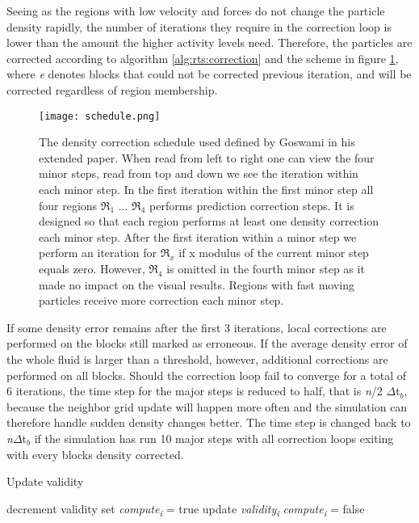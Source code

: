 \documentclass[../../main.tex]{subfiles}
\begin{document}
Seeing as the regions with low velocity and forces do not change the particle density rapidly, the number of iterations they require in the correction loop is lower than the amount the higher activity levels need. Therefore, the particles are corrected according to algorithm \ref{alg:rts:correction} and the scheme in figure \ref{fig:schedule}, where \textit{e} denotes blocks that could not be corrected previous iteration, and will be corrected regardless of region membership. 

\begin{figure}[h!]
    \centering
    \texttt{[image: schedule.png]}
    \caption[Correction scheme for RTS]{ The density correction schedule used defined by Goswami in his extended paper. When read from left to right one can view the four minor steps, read from top and down we see the iteration within each minor step. In the first iteration within the first minor step all four regions $\Re_1$ ... $\Re_4$ performs prediction correction steps. It is designed so that each region performs at least one density correction each minor step. After the first iteration within a minor step we perform an iteration for $\Re_x$ if x modulus of the current minor step equals zero. However, $\Re_4$ is omitted in the fourth minor step as it made no impact on the visual results. Regions with fast moving particles receive more correction each minor step. }
    \label{fig:schedule}
\end{figure}

If some density error remains after the first 3 iterations, local corrections are performed on the blocks still marked as erroneous. If the average density error of the whole fluid is larger than a threshold, however, additional corrections are performed on all blocks. Should the correction loop fail to converge for a total of 6 iterations, the time step for the major steps is reduced to half, that is \textit{n}/2 $\Delta$t$_b$, because the neighbor grid update will happen more often and the simulation can therefore handle sudden density changes better. The time step is changed back to \textit{n}$\Delta$t$_b$ if the simulation has run 10 major steps with all correction loops exiting with every blocks density corrected. 

 
\begin{algorithm}[h]
    \caption{Update validity}
    \label{alg:validity}
    \begin{algorithmic}[1]
            \State decrement validity
                \State set \textit{{\texorpdfstring{compute\textsubscript{i}}{compute i}}} = true
                \State update \textit{{\texorpdfstring{validity\textsubscript{i}}{validity i}}}
            \Else
                \State \textit{{\texorpdfstring{compute\textsubscript{i}}{compute i}}} = false
            \EndIf
        \EndFor
   \end{algorithmic}
\end{algorithm}
\end{document}
